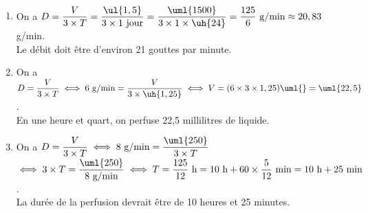 \begin{corrige}
\ \\ [-5mm]
   \begin{enumerate}
      \item On a $D =\dfrac{V}{3\times T} =\dfrac{\ul{1,5}}{3\times1\text{ jour}} =\dfrac{\uml{1500}}{3\times1\times\uh{24}} =\dfrac{125}{6}\text{ g/min} \approx20,83$ g/min. \\ [1mm]
         {\blue Le débit doit être d'environ 21 gouttes par minute.}
      \item On a $D =\dfrac{V}{3\times T} \iff 6\text{ g/min} =\dfrac{V}{3\times\uh{1,25}} \iff V =(6\times3\times1,25)\uml{} =\uml{22,5}$. \\ [1mm]
         {\blue En une heure et quart, on perfuse 22,5 millilitres de liquide.} \smallskip
      \item On a $D =\dfrac{V}{3\times T} \iff 8\text{ g/min} =\dfrac{\uml{250}}{3\times T}$ \\ [1mm]
         $\iff 3\times T =\dfrac{\uml{250}}{8\text{ g/min}} \iff T =\dfrac{125}{12} \text{ h} =10\text{ h}+60\times\dfrac{5}{12}\text{ min} =10\text{ h}+25\text{ min}$. \\ [1mm]
         {\blue La durée de la perfusion devrait être de 10 heures et 25 minutes}.
   \end{enumerate}
\end{corrige}

\pagebreak


